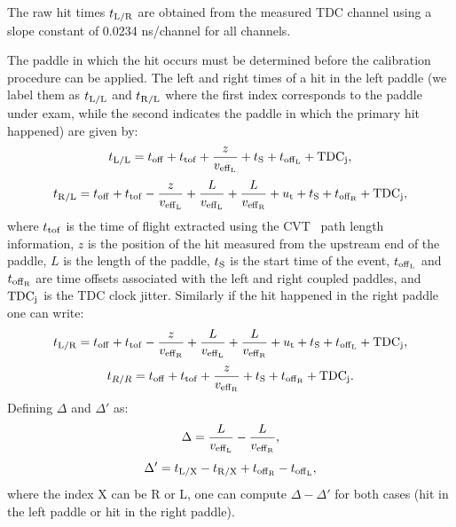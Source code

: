 The raw hit times $t_{{\rm{L}}/{\rm{R}}}$ are obtained from the measured TDC channel using a slope constant of 0.0234 ns/channel for all channels.

The paddle in which the hit occurs must be determined before the calibration procedure can be applied.
The left and right times of a hit in the left paddle (we label them as $t_{{\rm{L}}/{\rm{L}}}$ and $t_{\rm{R}/{\rm{L}}}$ where the first index corresponds to the paddle under exam, while the second indicates the paddle in which the primary hit happened) are given by:
\begin{equation}
t_{{\rm{L}}/{\rm{L}}}=t_{\rm{off}}+t_{\rm{tof}}+\frac{z}{v_{\rm{eff}_L}}+t_{\rm{S}}+t_{\rm{off}_{\rm{L}}}+{\rm{TDC}}_{\rm{j}},
\end{equation}
\begin{equation}
t_{{\rm{R}/{\rm{L}}}}=t_{\rm{off}}+t_{\rm{tof}}-\frac{z}{v_{\rm{eff}_L}}+\frac{L}{v_{\rm{eff}_L}}+\frac{L}{v_{\rm{eff}_{\rm{R}}}}+u_{\rm{t}}+t_{\rm{S}}+t_{\rm{off}_{\rm{R}}}+{\rm{TDC}}_{\rm{j}},
\end{equation}
where $t_{\rm{tof}}$ is the time of flight extracted using the CVT~\cite{svt-nim,mm-nim} path length information, $z$ is the position of the hit measured from the upstream end of the paddle, $L$ is the length of the paddle, $t_{\rm{S}}$ is the start time of the event, $t_{\rm{off}_{\rm{L}}}$ and $t_{\rm{off}_{\rm{R}}}$ are time offsets associated with the left and right coupled paddles, and ${\rm{TDC}}_{\rm{j}}$ is the TDC clock jitter.
Similarly if the hit happened in the right paddle one can write:
\begin{equation}\label{eq_time_hit_lr}
t_{{\rm{L}}/{\rm{R}}}=t_{\rm{off}}+t_{\rm{tof}}-\frac{z}{v_{\rm{eff}_{\rm{R}}}}+\frac{L}{v_{\rm{eff}_L}}+\frac{L}{v_{\rm{eff}_{\rm{R}}}}+u_{\rm{t}}+t_{\rm{S}}+t_{\rm{off}_{\rm{L}}}+{\rm{TDC}}_{\rm{j}},
\end{equation}
\begin{equation}
t_{R/R}=t_{\rm{off}}+t_{\rm{tof}}+\frac{z}{v_{\rm{eff}_{\rm{R}}}}+t_{\rm{S}}+t_{\rm{off}_{\rm{R}}}+{\rm{TDC}}_{\rm{j}}.
\end{equation}
Defining $\Delta$ and $\Delta'$ as:
\begin{equation}
\Delta=\frac{L}{v_{\rm{eff}_L}}-\frac{L}{v_{\rm{eff}_{\rm{R}}}},
\end{equation}
\begin{equation}
\Delta'=t_{\rm{L}/{\rm{X}}}-t_{\rm{R}/{\rm{X}}}+t_{\rm{off}_{\rm{R}}}-t_{\rm{off}_{\rm{L}}},
\end{equation}
where the index X can be R or L, one can compute $\Delta-\Delta'$ for both cases (hit in the left paddle or hit in the right paddle).
